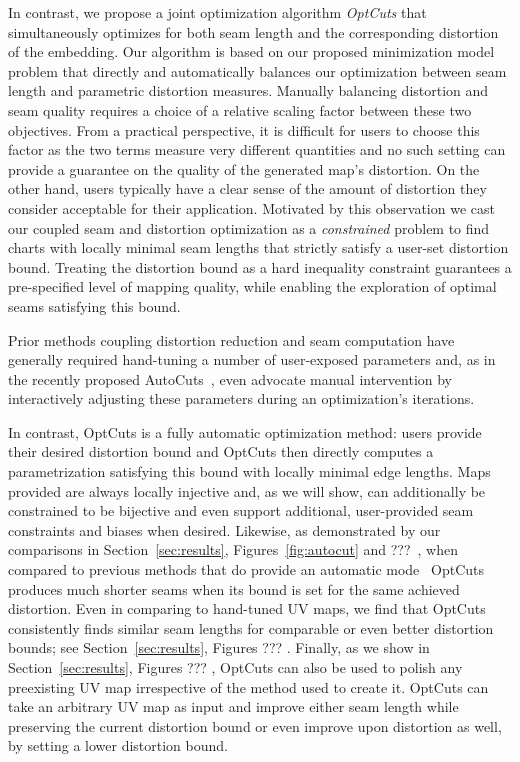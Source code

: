In contrast, we propose a joint optimization algorithm {\em OptCuts} that simultaneously optimizes for both seam length and the corresponding distortion of the embedding.
Our algorithm is based on our proposed minimization model problem that directly and automatically balances our optimization between seam length and parametric distortion measures. Manually balancing distortion and seam quality requires a choice of a relative scaling factor between these two objectives. From a practical perspective, it is difficult for users to choose this factor as the two terms measure very different quantities and no such setting can provide a guarantee on the quality of the generated map's distortion. 
On the other hand, users typically have a clear sense of the amount of distortion they consider acceptable for their application. Motivated by this observation we cast our coupled seam and distortion optimization as a \emph{constrained} problem to find charts with locally minimal seam lengths that strictly satisfy a user-set distortion bound. Treating the distortion bound as a hard inequality constraint guarantees a pre-specified level of mapping quality, while enabling the exploration of optimal seams satisfying this bound. %

Prior methods coupling distortion reduction and seam computation have generally required hand-tuning a number of user-exposed parameters and, as in the recently proposed AutoCuts~\cite{Poranne2017Autocuts}, even advocate manual intervention by interactively adjusting these parameters during an optimization's iterations.

In contrast, OptCuts is a fully automatic optimization method: users provide their desired distortion bound and OptCuts then directly computes a parametrization satisfying this bound with locally minimal edge lengths. Maps provided are always locally injective and, as we will show, can additionally be constrained to be bijective and even support additional, user-provided seam constraints and biases when desired. Likewise, as demonstrated by our comparisons in Section~\ref{sec:results}, Figures~\ref{fig:autocut} and ???~, when compared to previous methods that do provide an automatic mode~\cite{BoundedDistortParam:2002,Poranne2017Autocuts} OptCuts produces much shorter seams when its bound is set for the same achieved distortion. Even in comparing to hand-tuned UV maps, we find that OptCuts consistently finds similar seam lengths for comparable or even better distortion bounds; see Section~\ref{sec:results}, Figures ??? . Finally, as we show in Section~\ref{sec:results}, Figures ??? , OptCuts can also be used to polish any preexisting UV map irrespective of the method used to create it. OptCuts can take an arbitrary UV map as input and improve either seam length while preserving the current distortion bound or even improve upon distortion as well, by setting a lower distortion bound.

